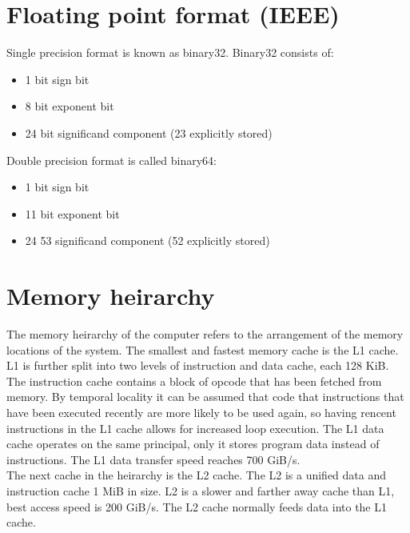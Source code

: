 \documentclass[letterpaper,10pt,titlepage]{article}
\begin{document}
\pagebreak

\section{Floating point format (IEEE)}

    Single precision format is known as binary32. Binary32 consists of: \\
    \begin{itemize}
        \item 1 bit sign bit
        \item 8 bit exponent bit
        \item 24 bit significand component (23 explicitly stored)
    \end{itemize}

    Double precision format is called binary64: \\
    
    \begin{itemize}
        \item 1 bit sign bit
        \item 11 bit exponent bit
        \item 24 53 significand component (52 explicitly stored)
    \end{itemize}

\pagebreak

\section{Memory heirarchy}

    The memory heirarchy of the computer refers to the arrangement of the memory locations 
    of the system. The smallest and fastest memory cache is the L1 cache. L1 is further split 
    into two levels of instruction and data cache, each 128 KiB. The instruction cache contains a block 
    of opcode that has been fetched from memory. By temporal locality it can be assumed that code
    that instructions that have been executed recently are more likely to be used again, so having 
    rencent instructions in the L1 cache allows for increased loop execution. The L1 data cache operates
    on the same principal, only it stores program data instead of instructions. The L1 data transfer speed
    reaches 700 GiB/s. \\ 
    
    The next cache in the heirarchy is the L2 cache. The L2 is a unified data and instruction cache 1 MiB 
    in size. L2 is a slower and farther away cache than L1, best access speed is 200 GiB/s. The L2 cache 
    normally feeds data into the L1 cache.  \\
    
\end{document}
